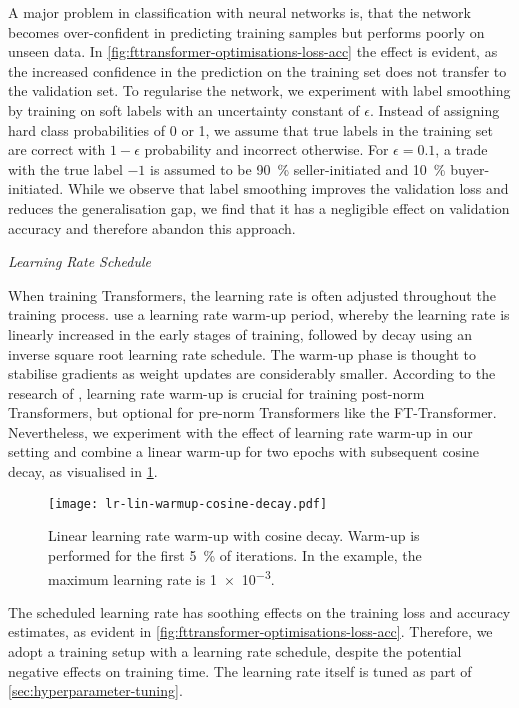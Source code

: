 A major problem in classification with neural networks is, that the network becomes over-confident in predicting training samples but performs poorly on unseen data. In \cref{fig:fttransformer-optimisations-loss-acc} the effect is evident, as the increased confidence in the prediction on the training set does not transfer to the validation set. To regularise the network, we experiment with label smoothing \autocite[][2823]{szegedyRethinkingInceptionArchitecture2016} by training on soft labels with an uncertainty constant of $\epsilon$. Instead of assigning hard class probabilities of 0 or 1, we assume that true labels in the training set are correct with $1-\epsilon$ probability and incorrect otherwise. For $\epsilon=\num{0.1}$, a trade with the true label $-1$ is assumed to be \SI{90}{\percent} seller-initiated and \SI{10}{\percent} buyer-initiated. While we observe that label smoothing improves the validation loss and reduces the generalisation gap, we find that it has a negligible effect on validation accuracy and therefore abandon this approach.

\emph{Learning Rate Schedule}

When training Transformers, the learning rate is often adjusted throughout the training process. \textcite[][7]{vaswaniAttentionAllYou2017} use a learning rate warm-up period, whereby the learning rate is linearly increased in the early stages of training, followed by decay using an inverse square root learning rate schedule. The warm-up phase is thought to stabilise gradients as weight updates are considerably smaller. According to the research of \textcite[][3--4]{xiongLayerNormalizationTransformer2020}, learning rate warm-up is crucial for training post-norm Transformers, but optional for pre-norm Transformers like the FT-Transformer. Nevertheless, we experiment with the effect of learning rate warm-up in our setting and combine a linear warm-up for two epochs with subsequent cosine decay, as visualised in \cref{fig:lr-lin-warmup-cosine-decay}.

\begin{figure}[!ht]
    \centering
    \texttt{[image: lr-lin-warmup-cosine-decay.pdf]}
    \caption[Linear Learning Rate Warm-Up With Cosine Decay]{Linear learning rate warm-up with cosine decay. Warm-up is performed for the first \SI{5}{\percent} of iterations. In the example, the maximum learning rate is \num{1e-3}.}
    \label{fig:lr-lin-warmup-cosine-decay}
\end{figure}

The scheduled learning rate has soothing effects on the training loss and accuracy estimates, as evident in \cref{fig:fttransformer-optimisations-loss-acc}. Therefore, we adopt a training setup with a learning rate schedule, despite the potential negative effects on training time. The learning rate itself is tuned as part of \cref{sec:hyperparameter-tuning}.


